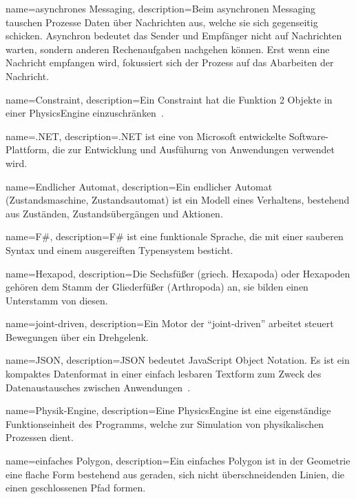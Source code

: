 %
%


%
%


%
%
{
  name={asynchrones Messaging},
  description={Beim asynchronen Messaging tauschen Prozesse Daten über Nachrichten aus,
    welche sie sich gegenseitig schicken.
    Asynchron bedeutet das Sender und Empfänger nicht auf Nachrichten warten,
    sondern anderen Rechenaufgaben nachgehen können.
    Erst wenn eine Nachricht empfangen wird, fokussiert sich der Prozess auf das Abarbeiten der Nachricht.}
}

{
  name={Constraint},
  description={Ein Constraint hat die Funktion 2 Objekte in einer \gls{PhysicsEngine} einzuschränken~\cite{gamedev:constraints}.}
}

{
  name={.NET},
  description={.NET ist eine von Microsoft entwickelte Software-Plattform,
    die zur Entwicklung und Ausfühurng von Anwendungen verwendet wird.}
}

{
  name={Endlicher Automat},
  description={Ein endlicher Automat (Zustandsmaschine, Zustandsautomat) ist ein Modell eines Verhaltens,
    bestehend aus Zuständen, Zustandsübergängen und Aktionen.}
}

{
  name={F\#},
  description={F\# ist eine funktionale Sprache,
    die mit einer sauberen Syntax und einem ausgereiften Typensystem besticht.}
}

{
  name={Hexapod},
  description={Die Sechsfüßer (griech. Hexapoda) oder Hexapoden
    gehören dem Stamm der Gliederfüßer (Arthropoda) an,
    sie bilden einen Unterstamm von diesen.}
}

{
  name={joint-driven},
  description={Ein Motor der ``joint-driven'' arbeitet steuert Bewegungen über ein Drehgelenk.}
}

{
  name={JSON},
  description={JSON bedeutet JavaScript Object Notation.
    Es ist ein kompaktes Datenformat in einer einfach lesbaren Textform
    zum Zweck des Datenaustausches zwischen Anwendungen~\cite{json}.}
}

{
  name={Physik-Engine},
  description={Eine \gls{PhysicsEngine} ist eine eigenständige Funktionseinheit des Programms,
    welche zur Simulation von physikalischen Prozessen dient.}
}

{
  name={einfaches Polygon},
  description={Ein einfaches Polygon ist in der Geometrie eine flache Form bestehend aus geraden,
    sich nicht überschneidenden Linien, die einen geschlossenen Pfad formen.}
}
